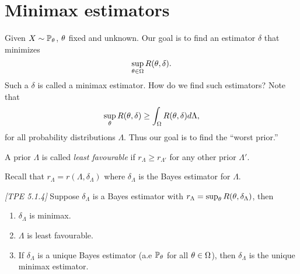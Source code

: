 \section{Minimax estimators}
Given $X \sim {\mathbb{P}}_{\theta}$, ${\theta}$ fixed and unknown. Our goal is to find an estimator $\delta$ that minimizes
\[\sup_{{\theta} \in {{\Omega}}} R({\theta},\delta). \]
Such a $\delta$ is called a minimax estimator. How do we find such estimators? Note that 
\[\sup_{\theta} R({\theta},\delta) \ge \int_{{\Omega}} R({\theta},\delta)d\Lambda, \]
for all probability distributions $\Lambda$. Thus our goal is to find the ``worst prior.''
\begin{defn}
    A prior $\Lambda$ is called \emph{least favourable} if $r_\Lambda \ge r_{\Lambda'}$ for any other prior $\Lambda'$.
\end{defn}
Recall that $r_{\Lambda} = r(\Lambda, \delta_\Lambda)$ where $\delta_\Lambda$ is the Bayes estimator for $\Lambda$.
\begin{thrm}
    \emph{[TPE 5.1.4]} Suppose $\delta_{\Lambda}$ is a Bayes estimator with $r_\Lambda = \sup_{\theta} R({\theta}, \delta_\Lambda)$, then 
    \begin{enumerate}
        \item $\delta_\Lambda$ is minimax.
        \item $\Lambda$ is least favourable.
        \item If $\delta_\Lambda$ is a unique Bayes estimator (a.e ${\mathbb{P}}_{\theta}$ for all ${\theta} \in {{\Omega}}$), then $\delta_\Lambda$ is the unique minimax estimator.
    \end{enumerate}
\end{thrm}
